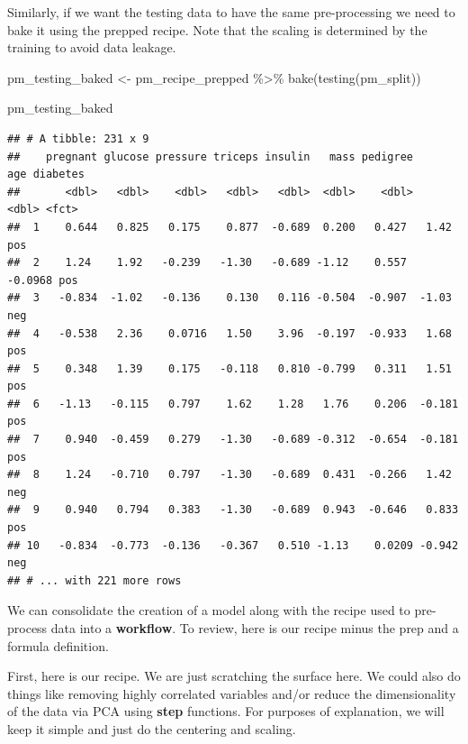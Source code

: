 \documentclass[
]{article}
\newenvironment{Shaded}{\begin{snugshade}}{\end{snugshade}}
\newcommand{\FunctionTok}[1]{\textcolor[rgb]{0.00,0.00,0.00}{#1}}
\newcommand{\NormalTok}[1]{#1}
\newcommand{\OtherTok}[1]{\textcolor[rgb]{0.56,0.35,0.01}{#1}}
\newcommand{\SpecialCharTok}[1]{\textcolor[rgb]{0.00,0.00,0.00}{#1}}
\begin{document}
Similarly, if we want the testing data to have the same pre-processing
we need to bake it using the prepped recipe. Note that the scaling is
determined by the training to avoid data leakage.

\begin{Shaded}
\begin{Highlighting}[]
\NormalTok{pm\_testing\_baked }\OtherTok{\textless{}{-}}\NormalTok{ pm\_recipe\_prepped }\SpecialCharTok{\%\textgreater{}\%}
  \FunctionTok{bake}\NormalTok{(}\FunctionTok{testing}\NormalTok{(pm\_split)) }

\NormalTok{pm\_testing\_baked}
\end{Highlighting}
\end{Shaded}

\begin{verbatim}
## # A tibble: 231 x 9
##    pregnant glucose pressure triceps insulin   mass pedigree     age diabetes
##       <dbl>   <dbl>    <dbl>   <dbl>   <dbl>  <dbl>    <dbl>   <dbl> <fct>   
##  1    0.644   0.825   0.175    0.877  -0.689  0.200   0.427   1.42   pos     
##  2    1.24    1.92   -0.239   -1.30   -0.689 -1.12    0.557  -0.0968 pos     
##  3   -0.834  -1.02   -0.136    0.130   0.116 -0.504  -0.907  -1.03   neg     
##  4   -0.538   2.36    0.0716   1.50    3.96  -0.197  -0.933   1.68   pos     
##  5    0.348   1.39    0.175   -0.118   0.810 -0.799   0.311   1.51   pos     
##  6   -1.13   -0.115   0.797    1.62    1.28   1.76    0.206  -0.181  pos     
##  7    0.940  -0.459   0.279   -1.30   -0.689 -0.312  -0.654  -0.181  pos     
##  8    1.24   -0.710   0.797   -1.30   -0.689  0.431  -0.266   1.42   neg     
##  9    0.940   0.794   0.383   -1.30   -0.689  0.943  -0.646   0.833  pos     
## 10   -0.834  -0.773  -0.136   -0.367   0.510 -1.13    0.0209 -0.942  neg     
## # ... with 221 more rows
\end{verbatim}

We can consolidate the creation of a model along with the recipe used to
pre-process data into a \textbf{workflow}. To review, here is our recipe
minus the prep and a formula definition.

First, here is our recipe. We are just scratching the surface here. We
could also do things like removing highly correlated variables and/or
reduce the dimensionality of the data via PCA using \textbf{step}
functions. For purposes of explanation, we will keep it simple and just
do the centering and scaling.
\end{document}
